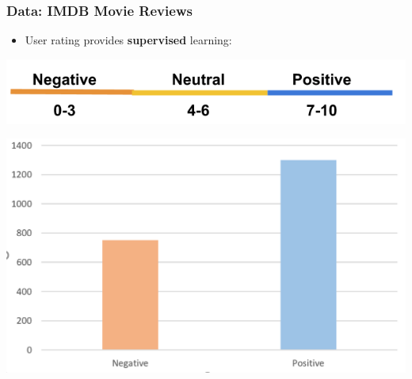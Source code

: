 \documentclass{beamer}
\begin{document}
\begin{frame}
	\frametitle{Data: IMDB Movie Reviews}
	\begin{itemize}
		\item User rating provides \textbf{supervised} learning:
	\end{itemize}
	\begin{center}
		\includegraphics[scale=0.4]{rating_bar}
	\end{center}
	\begin{center}
		\includegraphics[scale=0.5]{reviews}
	\end{center}
\end{frame}

\end{document}
